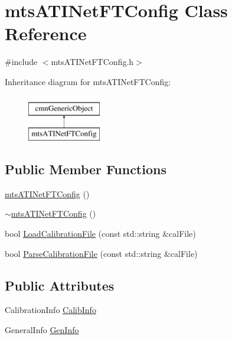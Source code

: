 \hypertarget{classmts_a_t_i_net_f_t_config}{\section{mts\-A\-T\-I\-Net\-F\-T\-Config Class Reference}
\label{classmts_a_t_i_net_f_t_config}
}


{\ttfamily \#include $<$mts\-A\-T\-I\-Net\-F\-T\-Config.\-h$>$}

Inheritance diagram for mts\-A\-T\-I\-Net\-F\-T\-Config\-:\begin{figure}[H]
\begin{center}
\leavevmode
\includegraphics[height=2.000000cm]{de/d7d/classmts_a_t_i_net_f_t_config}
\end{center}
\end{figure}
\subsection*{Public Member Functions}
\begin{DoxyCompactItemize}
\item 
\hyperlink{classmts_a_t_i_net_f_t_config_acde645f416f4db3de15efb0e01a6b088}{mts\-A\-T\-I\-Net\-F\-T\-Config} ()
\item 
\hyperlink{classmts_a_t_i_net_f_t_config_a3c3c637e2eb6fffeffb83b0bdc3cf5b6}{$\sim$mts\-A\-T\-I\-Net\-F\-T\-Config} ()
\item 
bool \hyperlink{classmts_a_t_i_net_f_t_config_acdb1e00147a03abf4453f9e7c4ab3835}{Load\-Calibration\-File} (const std\-::string \&cal\-File)
\item 
bool \hyperlink{classmts_a_t_i_net_f_t_config_a1c6b1f80185f59b081d6266e0f5d7714}{Parse\-Calibration\-File} (const std\-::string \&cal\-File)
\end{DoxyCompactItemize}
\subsection*{Public Attributes}
\begin{DoxyCompactItemize}
\item 
Calibration\-Info \hyperlink{classmts_a_t_i_net_f_t_config_a8a79d092fb24d610b055aca16680e749}{Calib\-Info}
\item 
General\-Info \hyperlink{classmts_a_t_i_net_f_t_config_a683259eee30c2156fe2e46bb34caa4eb}{Gen\-Info}
\end{DoxyCompactItemize}
